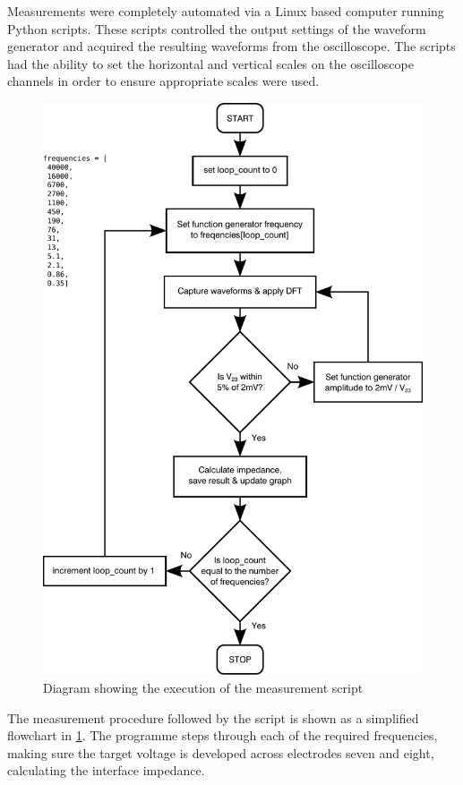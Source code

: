   Measurements were completely automated via a Linux based computer running Python scripts.
  These scripts controlled the output settings of the waveform generator and acquired the resulting waveforms from the oscilloscope.
  The scripts had the ability to set the horizontal and vertical scales on the oscilloscope channels in order to ensure appropriate scales were used.
  
  \begin{figure}
      \centering
      \includegraphics[width=\textwidth]{content/pt2/graphics/measurementFlowchart}
      \caption{\label{fig:creatingCSF_pythonFlowchart}Diagram showing the execution of the measurement script}
  \end{figure}
  
  The measurement procedure followed by the script is shown as a simplified flowchart in \cref{fig:creatingCSF_pythonFlowchart}.
  The programme steps through each of the required frequencies, making sure the target voltage is developed across electrodes seven and eight, calculating the interface impedance.
  
